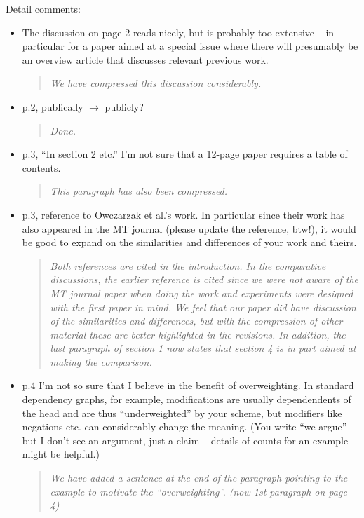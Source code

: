 \documentclass[letterpaper,12pt]{article}
\newenvironment{response}
{\begin{quotation} \it}
  {\end{quotation}}
\begin{document}
Detail comments:

\begin{itemize}
\item The discussion on page 2 reads nicely, but is probably too
  extensive -- in particular for a paper aimed at a special issue
  where there will presumably be an overview article that discusses
  relevant previous work.
  \begin{response}
    We have compressed this discussion considerably.
  \end{response}

\item  p.2, publically $\to$ publicly?
  \begin{response}
    Done.
  \end{response}

\item  p.3, ``In section 2 etc.'' I'm not sure that a 12-page paper
  requires a table of contents.
  \begin{response}
    This paragraph has also been compressed.
  \end{response}

\item  p.3, reference to Owczarzak et al.'s work. In particular since
  their work has also appeared in the MT journal (please update the
  reference, btw!), it would be good to expand on the similarities and
  differences of your work and theirs.
  \begin{response}
    Both references are cited in the introduction.  In the comparative
    discussions, the earlier reference is cited since we were not aware of
    the MT journal paper when doing the work and experiments were designed
    with the first paper in mind.  We feel that our paper did have 
    discussion of the similarities and differences, but with the compression
    of other material these are better highlighted in the revisions. In addition, the last
    paragraph of section 1 now states that section 4 is in part aimed at making
    the comparison.
  \end{response}

\item p.4 I'm not so sure that I believe in the benefit of overweighting.
  In standard dependency graphs, for example, modifications are
  usually dependendents of the head and are thus ``underweighted'' by
  your scheme, but modifiers like negations etc. can considerably
  change the meaning.  (You write ``we argue'' but I don't see an
  argument, just a claim -- details of counts for an example might be
  helpful.)
  \begin{response}
  We have added a sentence at the end of the paragraph pointing to the example
to motivate the ``overweighting''. (now 1st paragraph on page 4)
  \end{response}


\end{itemize}
\end{document}
